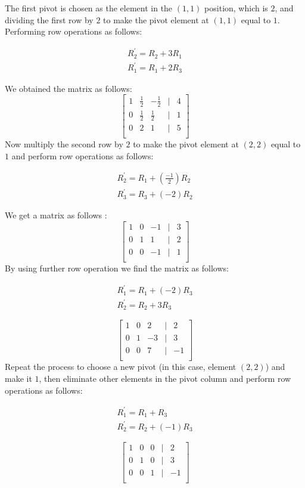 The first pivot is chosen as the element in the $(1,1)$ position, which is $2$, and dividing the first row by $2$ to make the pivot element at $(1, 1)$ equal to $1$.
Performing row operations as follows:
\begin{center}
    \begin{align*}
        R_2^{'} = R_2 + 3R_1\\
        R_1^{'} = R_1 + 2R_3
    \end{align*}
\end{center}
We obtained the matrix as follows:
\[
\begin{bmatrix}
1 & \frac{1}{2} & -\frac{1}{2} & | & 4 \\
0 & \frac{1}{2} & \frac{1}{2} & | & 1 \\
0 & 2 & 1 & | & 5 \\
\end{bmatrix}
\] 
Now multiply the second row by $2$ to make the pivot element at $(2, 2)$ equal to $1$ and perform row operations as follows:
\begin{center}
    \begin{align*}
        R_2^{'} = R_1 +(\frac{-1}{2})R_2 \\
        R_3^{'} = R_3 +(-2)R_2
    \end{align*}
\end{center}
We get a matrix as follows :
\[
\begin{bmatrix}
1 & 0 & -1 & | & 3 \\
0 & 1 &  1 & | & 2 \\
0 & 0 & -1 & | & 1 \\
\end{bmatrix}
\]
By using further row operation we find the matrix as follows:
\begin{center}
    \begin{align*}
        R_1^{'} = R_1 + (-2)R_3 \\
        R_2^{'} = R_2 + 3R_3
    \end{align*}
\end{center}
\[
\begin{bmatrix}
1 & 0 & 2 & | & 2 \\
0 & 1 & -3 & | & 3 \\
0 & 0 & 7 & | & -1 \\
\end{bmatrix}
\]
Repeat the process to choose a new pivot (in this case, element $(2,2)$) and make it $1$, then eliminate other elements in the pivot column and perform row operations as follows:
\begin{center}
    \begin{align*}
        R_1^{'} = R_1 + R_3 \\
        R_2^{'} = R_2 + (-1) R_3
    \end{align*}
\end{center}
\[
\begin{bmatrix}
1 & 0 & 0 & | & 2 \\
0 & 1 & 0 & | & 3 \\
0 & 0 & 1 & | & -1 \\
\end{bmatrix}
\]


